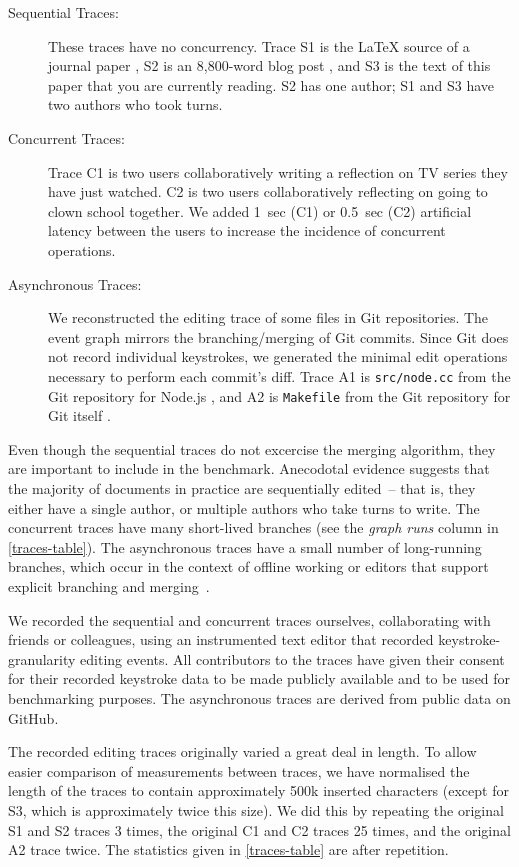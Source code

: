 \documentclass[sigplan,10pt]{acmart}
\begin{document}
\begin{description}
    \item[Sequential Traces:] These traces have no concurrency. Trace S1 is the LaTeX source of a journal paper \cite{Kleppmann2017,automerge-perf}, S2 is an 8,800-word blog post \cite{crdts-go-brrr}, and S3 is the text of this paper that you are currently reading.
        S2 has one author; S1 and S3 have two authors who took turns.
    \item[Concurrent Traces:] Trace C1 is two users collaboratively writing a reflection on TV series they have just watched. C2 is two users collaboratively reflecting on going to clown school together. We added 1~sec (C1) or 0.5~sec (C2) artificial latency between the users to increase the incidence of concurrent operations.
    \item[Asynchronous Traces:] We reconstructed the editing trace of some files in Git repositories. The event graph mirrors the branching/merging of Git commits. Since Git does not record individual keystrokes, we generated the minimal edit operations necessary to perform each commit's diff. Trace A1 is \texttt{src/node.cc} from the Git repository for Node.js \cite{node-src-nodecc}, and A2 is \texttt{Makefile} from the Git repository for Git itself \cite{git-makefile}.
\end{description}

Even though the sequential traces do not excercise the merging algorithm, they are important to include in the benchmark.
Anecodotal evidence suggests that the majority of documents in practice are sequentially edited~-- that is, they either have a single author, or multiple authors who take turns to write.
The concurrent traces have many short-lived branches (see the \emph{graph runs} column in \autoref{traces-table}).
The asynchronous traces have a small number of long-running branches, which occur in the context of offline working or editors that support explicit branching and merging~\cite{Upwelling,Patchwork}.

We recorded the sequential and concurrent traces ourselves, collaborating with friends or colleagues, using an instrumented text editor that recorded keystroke-granularity editing events.
All contributors to the traces have given their consent for their recorded keystroke data to be made publicly available and to be used for benchmarking purposes.
The asynchronous traces are derived from public data on GitHub.

The recorded editing traces originally varied a great deal in length.
To allow easier comparison of measurements between traces, we have normalised the length of the traces to contain approximately 500k inserted characters (except for S3, which is approximately twice this size).
We did this by repeating the original S1 and S2 traces 3 times, the original C1 and C2 traces 25 times, and the original A2 trace twice.
The statistics given in \autoref{traces-table} are after repetition.
\end{document}
